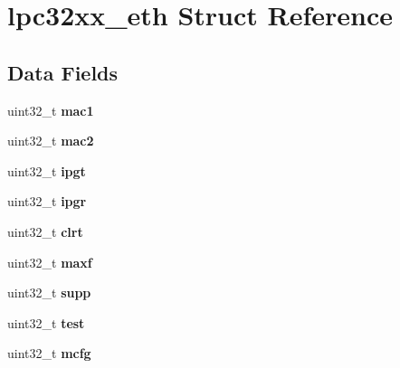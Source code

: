 \hypertarget{structlpc32xx__eth}{}\section{lpc32xx\+\_\+eth Struct Reference}
\label{structlpc32xx__eth}
\subsection*{Data Fields}
\begin{DoxyCompactItemize}
\item 
\mbox{\label{structlpc32xx__eth_a22cefc4a92dc4b48914fc3c6652ad645}} 
uint32\+\_\+t {\bfseries mac1}
\item 
\mbox{\label{structlpc32xx__eth_a886f1cc414b664f15cf955bcf43e2b41}} 
uint32\+\_\+t {\bfseries mac2}
\item 
\mbox{\label{structlpc32xx__eth_a10006d57b14ad201abd62a7d3d7d2bd8}} 
uint32\+\_\+t {\bfseries ipgt}
\item 
\mbox{\label{structlpc32xx__eth_aae25cf6210397faab6a8d2246193715f}} 
uint32\+\_\+t {\bfseries ipgr}
\item 
\mbox{\label{structlpc32xx__eth_aed7e918b6dd85ae56e27144e8ee76cf9}} 
uint32\+\_\+t {\bfseries clrt}
\item 
\mbox{\label{structlpc32xx__eth_afe667ef096e6ac07c4d3f6464a772885}} 
uint32\+\_\+t {\bfseries maxf}
\item 
\mbox{\label{structlpc32xx__eth_aa7d446e764ea660199c9a003dff89067}} 
uint32\+\_\+t {\bfseries supp}
\item 
\mbox{\label{structlpc32xx__eth_ad3dd133a48e17d56dea882f7cbc33d25}} 
uint32\+\_\+t {\bfseries test}
\item 
\mbox{\label{structlpc32xx__eth_a62778c107d2535f3530b3a41bad01c97}} 
uint32\+\_\+t {\bfseries mcfg}
\item 
\mbox{\label{structlpc32xx__eth_af90814207fd33ca96e3afb381ee3e5e7}} 

\end{DoxyCompactItemize}

